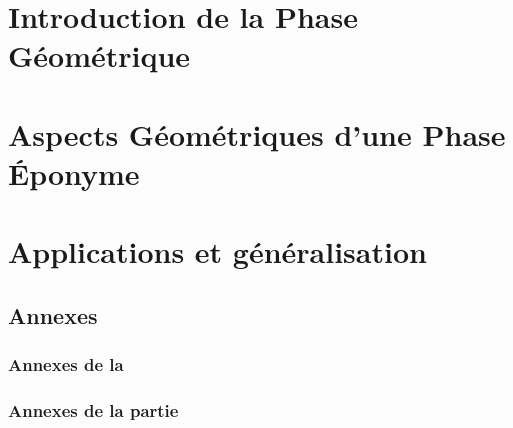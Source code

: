 

\part{Introduction de la Phase Géométrique} \label{part:param_instant} 


\part{Aspects Géométriques d'une Phase Éponyme} \label{part:phase_geo} 


\part{Applications et généralisation} \label{part:app&gene} 

	

	
	
	
	

\newpage





\begin{annexe}
	\part*{Annexes}
	
	\section{Annexes de la \cref{part:param_instant}} 
		
	
	\section{Annexes de la partie \cref{part:phase_geo}}
		
\end{annexe}


\vfill


 {}\listoffigures
\lstlistoflistings

\vfill




\newpage

{}


